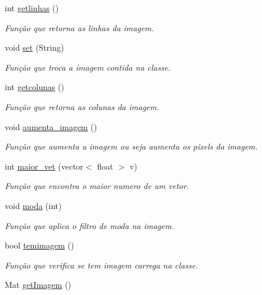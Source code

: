 \begin{DoxyCompactItemize}
int \mbox{\hyperlink{classimagem_ae87ae55ee13fbfe25158eed459af857f}{getlinhas}} ()
\begin{DoxyCompactList}\small\item\em Função que retorna as linhas da imagem. \end{DoxyCompactList}\item 
void \mbox{\hyperlink{classimagem_a2429e4cd88c01ee01550bcc2ea5dd709}{set}} (String)
\begin{DoxyCompactList}\small\item\em Função que troca a imagem contida na classe. \end{DoxyCompactList}\item 
int \mbox{\hyperlink{classimagem_a561c2829106e5df33e62b4cb3c9ceac1}{getcolunas}} ()
\begin{DoxyCompactList}\small\item\em Função que retorna as colunas da imagem. \end{DoxyCompactList}\item 
void \mbox{\hyperlink{classimagem_aea8dbfce37d53ab5482831ae9feb9997}{aumenta\+\_\+imagem}} ()
\begin{DoxyCompactList}\small\item\em Função que aumenta a imagem ou seja aumenta os pixels da imagem. \end{DoxyCompactList}\item 
int \mbox{\hyperlink{classimagem_a3648601eb35468c0d0d3ec911491f393}{maior\+\_\+vet}} (vector$<$ float $>$ v)
\begin{DoxyCompactList}\small\item\em Função que encontra o maior numero de um vetor. \end{DoxyCompactList}\item 
void \mbox{\hyperlink{classimagem_a4be2827cf5fe60ee27c8acf74a2aa806}{moda}} (int)
\begin{DoxyCompactList}\small\item\em Função que aplica o filtro de moda na imagem. \end{DoxyCompactList}\item 
bool \mbox{\hyperlink{classimagem_a4280dd018d44d3d84f4d627f937d3d96}{temimagem}} ()
\begin{DoxyCompactList}\small\item\em Função que verifica se tem imagem carrega na classe. \end{DoxyCompactList}\item 
Mat \mbox{\hyperlink{classimagem_ae86c0f56ad56fb4cc9f0a9020fc856d4}{get\+Imagem}} ()

\end{DoxyCompactItemize}
